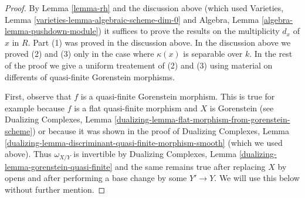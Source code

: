 \begin{proof}
By Lemma \ref{lemma-rh} and the discussion above
(which used
Varieties, Lemma \ref{varieties-lemma-algebraic-scheme-dim-0}
and
Algebra, Lemma \ref{algebra-lemma-pushdown-module})
it suffices to prove the results on the
multiplicity $d_x$ of $x$ in $R$. Part (1) was proved
in the discussion above. In the discussion above
we proved (2) and (3) only in the case where $\kappa(x)$ is
separable over $k$.
In the rest of the proof we give a uniform treatement
of (2) and (3) using material on differents of
quasi-finite Gorenstein morphisms.

\medskip\noindent
First, observe that $f$ is a quasi-finite Gorenstein morphism.
This is true for example because
$f$ is a flat quasi-finite morphism and $X$ is Gorenstein
(see Dualizing Complexes, Lemma
\ref{dualizing-lemma-flat-morphism-from-gorenstein-scheme})
or because it was shown in the proof of
Dualizing Complexes, Lemma
\ref{dualizing-lemma-discriminant-quasi-finite-morphism-smooth}
(which we used above). Thus $\omega_{X/Y}$ is invertible by
Dualizing Complexes, Lemma \ref{dualizing-lemma-gorenstein-quasi-finite}
and the same remains true after replacing $X$ by opens and after
performing a base change by some $Y' \to Y$. We will use this
below without further mention.


\end{proof}
